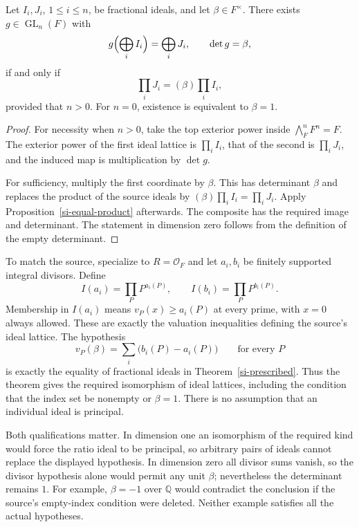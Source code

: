 \begin{theorem}\label{si-prescribed}
Let \(I_i,J_i\), \(1\le i\le n\), be fractional
ideals, and let \(\beta\in F^\times\).
There exists \(g\in\operatorname{GL}_n(F)\) with
\[
          g\Bigl(\bigoplus_i I_i\Bigr)
                   =\bigoplus_i J_i,
          \qquad \det g=\beta,
\]
if and only if
\[
             \prod_iJ_i=(\beta)\prod_iI_i,
\]
provided that \(n>0\).  For \(n=0\), existence is
equivalent to \(\beta=1\).
\end{theorem}
\begin{proof}
For necessity when \(n>0\), take the top exterior
power inside \(\bigwedge^n_F F^n=F\).
The exterior power of the first ideal lattice is
\(\prod_iI_i\), that of the second is
\(\prod_iJ_i\), and the induced map is multiplication
by \(\det g\).

For sufficiency, multiply the first coordinate by
\(\beta\).  This has determinant \(\beta\) and
replaces the product of the source ideals by
\((\beta)\prod_iI_i=\prod_iJ_i\).
Apply Proposition~\ref{si-equal-product} afterwards.
The composite has the required image and determinant.
The statement in dimension zero follows from the
definition of the empty determinant.
\end{proof}

To match the source, specialize to
\(R=\mathcal O_F\) and let
\(a_i,b_i\) be finitely supported integral divisors.
Define
\[
 I(a_i)=\prod_P P^{a_i(P)},\qquad
 I(b_i)=\prod_P P^{b_i(P)}.
\]
Membership in \(I(a_i)\) means
\(v_P(x)\ge a_i(P)\) at every prime, with \(x=0\)
always allowed.  These are exactly the valuation
inequalities defining the source's ideal lattice.
The hypothesis
\[
              v_P(\beta)=\sum_i\bigl(b_i(P)-a_i(P)\bigr)
              \qquad\text{for every }P
\]
is exactly the equality of fractional ideals in
Theorem~\ref{si-prescribed}.
Thus the theorem gives the required isomorphism of ideal lattices,
including the condition that the index set be nonempty or \(\beta=1\).
There is no assumption that an individual ideal is
principal.

Both qualifications matter.  In dimension one an
isomorphism of the required kind would force the
ratio ideal to be principal, so arbitrary pairs of
ideals cannot replace the displayed hypothesis.
In dimension zero all divisor sums vanish, so the
divisor hypothesis alone would permit any unit
\(\beta\); nevertheless the determinant remains
\(1\).  For example, \(\beta=-1\) over \(\mathbb Q\)
would contradict the conclusion if the source's
empty-index condition were deleted.
Neither example satisfies all the actual hypotheses.


